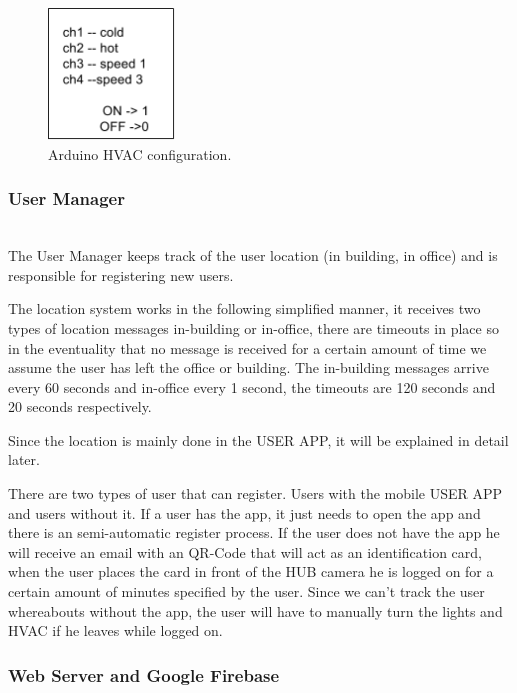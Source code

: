 \begin{figure}[h]
\centering
\includegraphics[width=0.3\textwidth]{Figures/temperature_post_imp}
\caption{Arduino HVAC configuration.}
\label{arduino_post_imp}
\end{figure}


\subsubsection{User Manager}\mbox{}\\


The User Manager keeps track of the user location (in building, in office) and is responsible for registering new users.

The location system works in the following simplified manner, it receives two types of location messages in-building or in-office, there are timeouts in place so in the eventuality that no message is received for a certain amount of time we assume the user has left the office or building. The in-building messages arrive every 60 seconds and in-office every 1 second, the timeouts are 120 seconds and 20 seconds respectively.

Since the location is mainly done in the USER APP, it will be explained in detail later.


There are two types of user that can register. Users with the mobile USER APP and users without it. If a user has the app, it just needs to open the app and there is an semi-automatic register process. If the user does not have the app he will receive an email with an QR-Code that will act as an identification card, when the user places the card in front of the HUB camera he is logged on for a certain amount of minutes specified by the user. Since we can't track the user whereabouts without the app, the user will have to manually turn the lights and \ac{HVAC} if he leaves while logged on.



\subsubsection{Web Server and Google Firebase}\mbox{}\\

